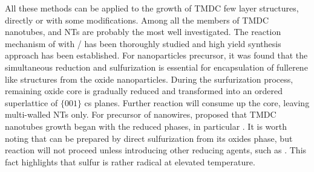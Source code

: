 All these methods can be applied to the growth of TMDC few layer structures, directly or with some modifications. Among all the members of TMDC nanotubes,  and  NTs are probably the most well investigated.\cite{Homyonfer1997,Tenne1998,Frey1998,Frey1999,Rothschild2000,Zak2000} The reaction mechanism of  with / has been thoroughly studied \cite{Feldman1998} and high yield synthesis approach has been established.\cite{Margolin2004} For  nanoparticles precursor, it was found that the simultaneous reduction and sulfurization is essential for encapsulation of fullerene like  structures from the oxide nanoparticles. During the surfurization process, remaining oxide core is gradually reduced and transformed into an ordered superlattice of $\{ 001 \}$ \gls{cs} planes. Further reaction will consume up the  core, leaving multi-walled  NTs only. For precursor of  nanowires, \citeauthor{Feldman1996} proposed that TMDC nanotubes growth began with the reduced  phases, in particular .\cite{Feldman1996} It is worth noting that  can be prepared by direct sulfurization from its oxides phase, but reaction  will not proceed unless introducing other reducing agents, such as .\cite{Tsirlina1998} This fact highlights that sulfur is rather radical at elevated temperature.

